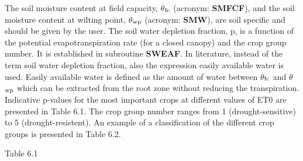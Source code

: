 The soil moisture content at field capacity, {\bf $\theta$$_{{\rm fc}}$} (acronym: {\bf SMFCF}), and the soil moisture
content at wilting point, {\bf $\theta$$_{{\rm wp}}$} (acronym: {\bf SMW}), are soil specific and should be given by
the user. The soil water depletion fraction, p, is a function of the potential evapotranspir\-ation rate (for a closed canopy) and the crop group number. It is established in subroutine
{\bf SWEAF}. In literature, instead of the term soil water depletion fraction, also the expres\-sion easily available water is used. Easily available water is defined as the amount of
water between $\theta$$_{{\rm fc}}$ and $\theta$$_{{\rm wp}}$ which can be extracted from the root zone without reducing the
transpiration. Indicative p-values for the most important crops at different values of ET0
are presented in Table 6.1. The crop group number ranges from 1 (drought-sensitive) to 5
(drought-resistent). An example of a classification of the different crop groups is
presented in Table 6.2.


Table 6.1
\testlastline

